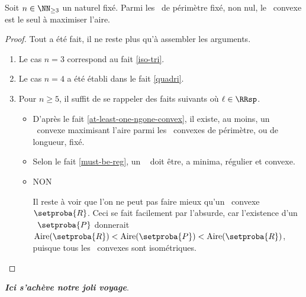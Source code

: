 \begin{fact}
    Soit $n \in \NN_{\geq3}$ un naturel fixé.
    Parmi les \ngones\ de périmètre fixé, non nul,
    le \nreg\ convexe est le seul à maximiser l'aire.
\end{fact}


\begin{proof}
    Tout a été fait, il ne reste plus qu'à assembler les arguments.
    \begin{enumerate}
        \item Le cas $n = 3$ correspond au fait \ref{iso-tri}.
        
        \item Le cas $n = 4$ a été établi dans le fait \ref{quadri}.
        
        \item Pour $n \geq 5$, il suffit de se rappeler des faits suivants où $\ell \in \RRsp$.
        \begin{itemize}
            \item D'après le fait \ref{at-least-one-ngone-convex}, il existe, au moins, un \ngone\ convexe maximisant l'aire parmi les \ngones\ convexes de périmètre, ou de longueur, fixé.

            \item Selon le fait \ref{must-be-reg}, un \ngone\  doit être, a minima, régulier et convexe.

            \item NON
            
             Il reste à voir que l'on ne peut pas faire mieux qu'un \nreg\ convexe $\setproba{R}$. Ceci se fait facilement par l'absurde, car l'existence d'un  \ngone\ $\setproba{P}$ donnerait $\area{\setproba{R}} < \area{\setproba{P}} < \area{\setproba{R}}$, puisque tous les \nregs\ convexes sont isométriques. 
        \end{itemize} 
	
	\null\vspace{-6ex}
    \end{enumerate}
\end{proof}

\bigskip
\hfill {\small\itshape\bfseries Ici s'achève notre joli voyage}.